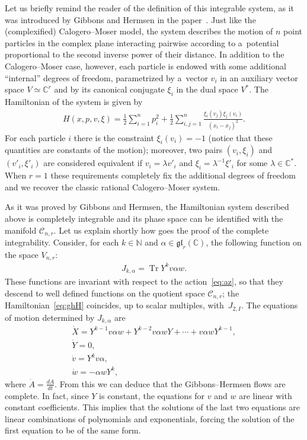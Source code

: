 \documentclass[pdftex]{sigma}
\newcommand{\bb}[1]{\mathbb{#1}}
\DeclareMathOperator{\tr}{Tr}
\begin{document}
Let us brief\/ly remind the reader of the def\/inition of this integrable system, as it was introduced by
Gibbons and Hermsen in the paper~\cite{gh84}.
Just like the (complexif\/ied) Calogero--Moser model, the system describes the motion of $n$ point
particles in the complex plane interacting pairwise according to a~potential proportional to the second
inverse power of their distance.
In addition to the Calogero--Moser case, however, each particle is endowed with some additional
``internal'' degrees of freedom, parametrized by a~vector \(v_{i}\) in an auxiliary vector space
$V\simeq\bb{C}^r$ and by its canonical conjugate \(\xi_{i}\) in the dual space $V^{\ast}$.
The Hamiltonian of the system is given by
\begin{gather}
\label{eq:ghH}
H(x,p,v,\xi)=\frac{1}{2}\sum_{i=1}^{n}p_{i}^{2}+\frac{1}{2}\sum_{i,j=1}^{n}\frac{\xi_i(v_j)\xi_j(v_i)}
{(x_i-x_j)^{2}}.
\end{gather}
For each particle \(i\) there is the constraint $\xi_{i}(v_{i})=-1$ (notice that these quantities are
constants of the motion); moreover, two pairs \((v_{i},\xi_{i})\) and \((v'_{i},\xi'_{i})\) are considered
equivalent if \(v_{i} = \lambda v'_{i}\) and \(\xi_{i} = \lambda^{-1}\xi'_{i}\) for some \(\lambda\in
\bb{C}^{*}\).
When \(r=1\) these requirements completely f\/ix the additional degrees of freedom and we recover the
classic rational Calogero--Moser system.

As it was proved by Gibbons and Hermsen, the Hamiltonian system described above is completely integrable
and its phase space can be identif\/ied with the manifold \(\mathcal{C}_{n,r}\).
Let us explain shortly how goes the proof of the complete integrability.
Consider, for each \(k\in \bb{N}\) and \(\alpha\in \mathfrak{gl}_{r}(\bb{C})\), the following function on
the space \(V_{n,r}\):
\begin{gather}
\label{eq:fh}
J_{k,\alpha}=\tr Y^{k}v\alpha w.
\end{gather}
These functions are invariant with respect to the action~\eqref{eq:az}, so that they descend to well
def\/ined functions on the quotient space \(\mathcal{C}_{n,r}\); the Hamiltonian~\eqref{eq:ghH} coincides,
up to scalar multiples, with~$J_{2,I}$.
The equations of motion determined by \(J_{k,\alpha}\) are
\begin{gather*}
\dot{X}=Y^{k-1}v\alpha w+Y^{k-2}v\alpha wY+\cdots +v\alpha wY^{k-1},
\\
\dot{Y}=0,
\\
\dot{v}=Y^kv\alpha,
\\
\dot{w}=-\alpha wY^{k},
\end{gather*}
where $\dot{A}=\frac{dA}{dt}$.
From this we can deduce that the Gibbons--Hermsen f\/lows are complete.
In fact, since $Y$ is constant, the equations for $v$ and $w$ are linear with constant coef\/f\/icients.
This implies that the solutions of the last two equations are linear combinations of polynomials and
exponentials, forcing the solution of the f\/irst equation to be of the same form.
\end{document}
